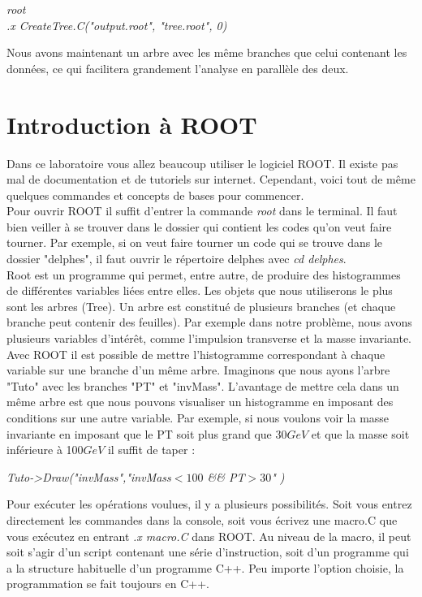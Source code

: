 \documentclass[a4paper]{report}
\begin{document}
\begin{flushleft}
\textit{root} \\
\textit{.x CreateTree.C("output.root", "tree.root", 0)}
\end{flushleft}

Nous avons maintenant un arbre avec les même branches que celui contenant les données, ce qui facilitera grandement l'analyse en parallèle des deux.

\section{Introduction à ROOT}

Dans ce laboratoire vous allez beaucoup utiliser le logiciel ROOT. Il existe pas mal de documentation et de tutoriels sur internet. Cependant, voici tout de même quelques commandes et concepts de bases pour commencer. \\

Pour ouvrir ROOT il suffit d'entrer la commande \textit{root} dans le terminal. Il faut bien veiller à se trouver dans le dossier qui contient les codes qu'on veut faire tourner. Par exemple, si on veut faire tourner un code qui se trouve dans le dossier "delphes", il faut ouvrir le répertoire delphes avec \textit{cd delphes}. \\

Root est un programme qui permet, entre autre, de produire des histogrammes de différentes variables liées entre elles. Les objets que nous utiliserons le plus sont les arbres (Tree). Un arbre est constitué de plusieurs branches (et chaque branche peut contenir des feuilles). Par exemple dans notre problème, nous avons plusieurs variables d'intérêt, comme l'impulsion transverse et la masse invariante. Avec ROOT il est possible de mettre l'histogramme correspondant à chaque variable sur une branche d'un même arbre. Imaginons que nous ayons l'arbre "Tuto" avec les branches "PT" et "invMass". L'avantage de mettre cela dans un même arbre est que nous pouvons visualiser un histogramme en imposant des conditions sur une autre variable. Par exemple, si nous voulons voir la masse invariante en imposant que le PT soit plus grand que 30$GeV$ et que la masse soit inférieure à 100$GeV$ il suffit de taper : 
\w

\begin{flushleft}
\textit{Tuto->Draw("invMass","invMass$<100$ \&\& PT$>30$" )}
\end{flushleft} 

Pour exécuter les opérations voulues, il y a plusieurs possibilités. Soit vous entrez directement les commandes dans la console, soit vous écrivez une macro.C que vous exécutez en entrant \textit{.x macro.C} dans ROOT. Au niveau de la macro, il peut soit s'agir d'un script contenant une série d'instruction, soit d'un programme qui a la structure habituelle d'un programme C++. Peu importe l'option choisie, la programmation se fait toujours en C++. \\
\end{document}
